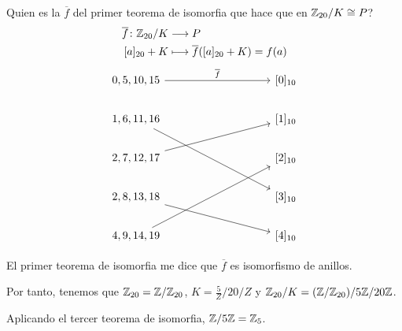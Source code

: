 \begin{example}
	Quien es la \(\overline{f}\) del primer teorema de isomorfia que hace que en \(\mathbb{Z}_{20}/K \cong P\)?
	\[
		\begin{aligned}
			\overline{f} \colon \mathbb{Z}_{20}/K & \longrightarrow P                                 \\
			[a]_{20} + K                  & \longmapsto \overline{f} ([a]_{20} + K ) = f(a )
		\end{aligned}
	\]
	\[\begin{tikzcd}
			{0, 5, 10, 15} &&&& {[0]_{10}} \\
			{1,6,11,16} &&&& {[1]_{10}} \\
			{2,7,12,17} &&&& {[2]_{10}} \\
			{2,8,13,18} &&&& {[3]_{10}} \\
			{4,9,14,19} &&&& {[4]_{10}}
			\arrow["{\overline{f}}", from=1-1, to=1-5]
			\arrow[from=3-1, to=2-5]
			\arrow[from=5-1, to=3-5]
			\arrow[from=2-1, to=4-5]
			\arrow[from=4-1, to=5-5]
		\end{tikzcd}\]
	
	El primer teorema de isomorfia me dice que \(\overline{f }\) es isomorfismo de anillos.
	
	Por tanto, tenemos que \(\mathbb{Z}_{20} = \mathbb{Z}/\mathbb{Z}_{20}\), \(K = \frac{5}{Z} / 20/Z \) y \(\mathbb{Z}_{20}/K = (\mathbb{Z} / \mathbb{Z}_{20 }) / 5\mathbb{Z} / 20\mathbb{Z} \).
	
	Aplicando el tercer teorema de isomorfia, \(\mathbb{Z} / 5\mathbb{Z} = \mathbb{Z}_5 \).
\end{example}

